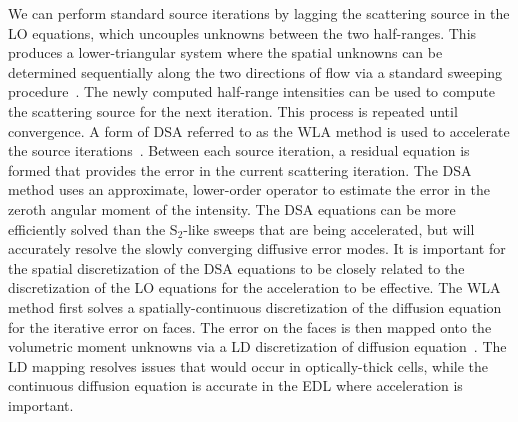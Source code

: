 \documentclass[11pt]{article}
\begin{document}
We can perform standard source iterations by lagging the scattering source in the LO
equations, which
uncouples unknowns between the two half-ranges.  This produces a lower-triangular
system where the spatial unknowns can be determined sequentially along the two directions of flow via a
standard sweeping procedure~\cite{lewis,morel_newton}.  The newly computed half-range
intensities can be used to compute the scattering source for the next iteration.  This
process is repeated until convergence.  
A form of DSA referred to as the WLA method is used to accelerate the source iterations~\cite{wla}. 
Between each source iteration, a residual equation is formed that provides 
the error in the current scattering iteration. The DSA method uses an approximate,
lower-order operator to estimate the error in the zeroth angular moment of the
intensity.  The DSA equations can be more efficiently
solved than the S$_2$-like sweeps that are being accelerated, but will accurately resolve the
slowly converging diffusive error modes.  It is important for the spatial discretization of the DSA
equations to be closely related to the discretization of the LO equations for the
acceleration to be effective.  The WLA method first solves a spatially-continuous
discretization of the diffusion equation
for the iterative error on faces.  The error on the faces is then mapped onto the
volumetric moment unknowns via a LD discretization of diffusion equation~\cite{wla}.
The LD mapping resolves issues that would occur in optically-thick cells, while the
continuous diffusion equation is accurate in the EDL where acceleration is important.
\end{document}
